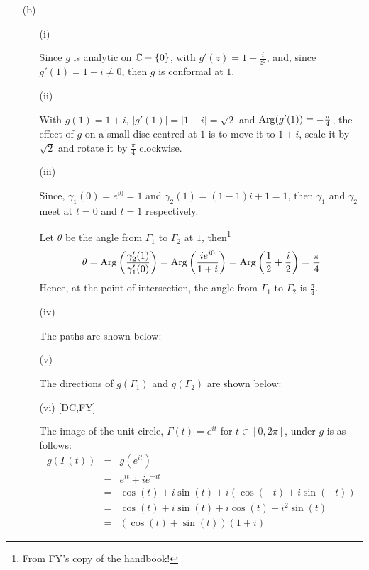 \begin{itemize}
\begin{itemize}
\end{itemize}

\item[(b)]

\begin{itemize}
\item[(i)]

Since $g$ is analytic on $\mathbb{C}-\{0\}$, with $g'(z) = 1-\frac{i}{z^2}$,
and, since $g'(1)=1-i\ne0$, then $g$ is conformal at $1$.

\item[(ii)]

With $g(1)=1+i$, $|g'(1)|=|1-i|=\sqrt{2}$ and
${\rm Arg}(g'(1))=-\frac{\pi}{4}$,
the effect of $g$ on a small disc centred at $1$ is to move it to $1+i$,
scale it by $\sqrt{2}$ and rotate it by $\frac{\pi}{4}$ clockwise.

\item[(iii)]

Since, $\gamma_1(0) = e^{i0} = 1$ and $\gamma_2(1) = (1-1)i+1 = 1$,
then $\gamma_1$ and $\gamma_2$ meet at $t=0$ and $t=1$ respectively.

Let $\theta$ be the angle from $\Gamma_1$ to $\Gamma_2$ at $1$,
then\footnote{From FY's copy of the handbook!}
\[
\theta	= {\rm Arg} \left( \frac{ \gamma_2'(1) }{ \gamma_1'(0) } \right)
	= {\rm Arg} \left( \frac{ ie^{i0} }{ 1+i } \right)
	= {\rm Arg} \left( \frac{1}{2} + \frac{i}{2} \right)
	= \frac{\pi}{4}
\]
Hence, at the point of intersection, the angle from $\Gamma_1$ to
$\Gamma_2$ is $\frac{\pi}{4}$.

\item[(iv)]

The paths are shown below:



\item[(v)]

The directions of $g(\Gamma_1)$ and $g(\Gamma_2)$ are shown below:



\item[(vi)][DC,FY]

The image of the unit circle, $\Gamma(t)=e^{it}$ for $t\in[0,2\pi]$,
under $g$ is as follows:
\begin{eqnarray*}
g(\Gamma(t))
	&=& g(e^{it}) \\
	&=& e^{it}+ie^{-it} \\
	&=& \cos(t) + i\sin(t) +i(\cos(-t)+i\sin(-t)) \\
	&=& \cos(t)+i\sin(t)+i\cos(t)-i^2\sin(t) \\
	&=& (\cos(t)+\sin(t))(1+i)
\end{eqnarray*}

\end{itemize}

\end{itemize}

